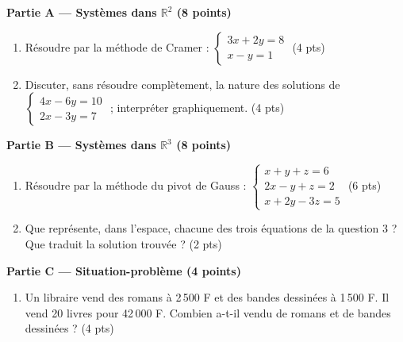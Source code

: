 \documentclass[a4paper,11pt]{article}
\begin{document}
\vspace{8pt}
\begin{tcolorbox}[colback=evalc!5, colframe=evalc, boxrule=0.8pt, arc=2pt,
                  left=7pt, right=7pt, top=5pt, bottom=5pt,
                  title={\textbf{Énoncé (durée : 30 min --- noté sur 20)}},
                  colbacktitle=evalc, coltitle=white, fonttitle=\bfseries]

\textbf{Partie A --- Systèmes dans $\mathbb{R}^2$ (8 points)}
\begin{enumerate}[leftmargin=*, itemsep=4pt]
  \item Résoudre par la méthode de Cramer : $\begin{cases}3x+2y=8\\ x-y=1\end{cases}$ \hfill (4 pts)
  \item Discuter, sans résoudre complètement, la nature des solutions de
        $\begin{cases}4x-6y=10\\ 2x-3y=7\end{cases}$ ; interpréter graphiquement. \hfill (4 pts)
\end{enumerate}

\textbf{Partie B --- Systèmes dans $\mathbb{R}^3$ (8 points)}
\begin{enumerate}[resume, leftmargin=*, itemsep=4pt]
  \item Résoudre par la méthode du pivot de Gauss :
        $\begin{cases}x+y+z=6\\ 2x-y+z=2\\ x+2y-3z=5\end{cases}$ \hfill (6 pts)
  \item Que représente, dans l'espace, chacune des trois équations de la
        question 3 ? Que traduit la solution trouvée ? \hfill (2 pts)
\end{enumerate}

\textbf{Partie C --- Situation-problème (4 points)}
\begin{enumerate}[resume, leftmargin=*, itemsep=4pt]
  \item Un libraire vend des romans à 2\,500 F et des bandes dessinées à
        1\,500 F. Il vend 20 livres pour 42\,000 F. Combien a-t-il vendu de
        romans et de bandes dessinées ? \hfill (4 pts)
\end{enumerate}
\end{tcolorbox}
\end{document}
